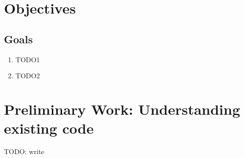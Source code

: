 \section{Objectives}

\subsection{Goals}
\begin{enumerate}
\item TODO1
\item TODO2
\end{enumerate}

\section{Preliminary Work: Understanding existing code}
TODO: write

